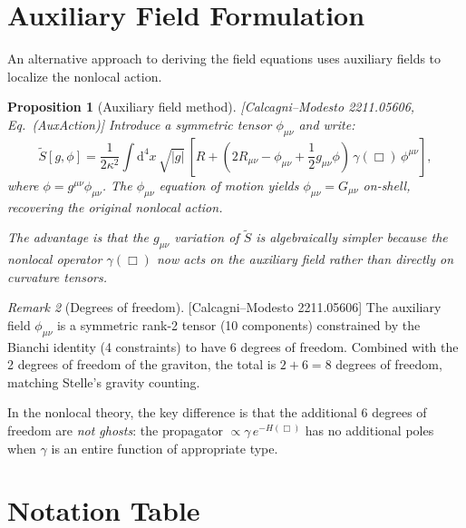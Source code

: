 \documentclass[12pt,a4paper]{article}
\newtheorem{proposition}{Proposition}[section]
\theoremstyle{definition}
\theoremstyle{remark}
\newtheorem{remark}[proposition]{Remark}
\newcommand{\dd}{\mathrm{d}}
\newcommand{\fromlit}[1]{\textcolor{blue!70!black}{\textsf{[#1]}}}
\begin{document}
\section{Auxiliary Field Formulation}
\label{sec:auxiliary}

An alternative approach to deriving the field equations uses auxiliary
fields to localize the nonlocal action.

\begin{proposition}[Auxiliary field method]
\label{prop:auxiliary}
\fromlit{Calcagni--Modesto 2211.05606, Eq.~(AuxAction)}
Introduce a symmetric tensor $\phi_{\mu\nu}$ and write:
\begin{equation}\label{eq:aux-action}
  \tilde{S}[g,\phi] = \frac{1}{2\kappa^2}\int\dd^4 x\,\sqrt{|g|}\,
  \left[R + (2R_{\mu\nu} - \phi_{\mu\nu}
    + \frac{1}{2}g_{\mu\nu}\phi)\,\gamma(\Box)\,\phi^{\mu\nu}\right],
\end{equation}
where $\phi = g^{\mu\nu}\phi_{\mu\nu}$.  The $\phi_{\mu\nu}$
equation of motion yields $\phi_{\mu\nu} = G_{\mu\nu}$ on-shell,
recovering the original nonlocal action.

The advantage is that the $g_{\mu\nu}$ variation of
$\tilde{S}$ is \emph{algebraically simpler} because the nonlocal
operator $\gamma(\Box)$ now acts on the auxiliary field rather than
directly on curvature tensors.
\end{proposition}

\begin{remark}[Degrees of freedom]
\fromlit{Calcagni--Modesto 2211.05606}
The auxiliary field $\phi_{\mu\nu}$ is a symmetric rank-2 tensor
(10 components) constrained by the Bianchi identity (4 constraints)
to have 6 degrees of freedom.  Combined with the 2 degrees of
freedom of the graviton, the total is $2 + 6 = 8$ degrees of freedom,
matching Stelle's gravity counting.

In the nonlocal theory, the key difference is that the additional
6 degrees of freedom are \emph{not ghosts}: the propagator
$\propto \gamma\,e^{-H(\Box)}$ has no additional poles when $\gamma$
is an entire function of appropriate type.
\end{remark}


\section{Notation Table}
\label{sec:notation}
\end{document}
